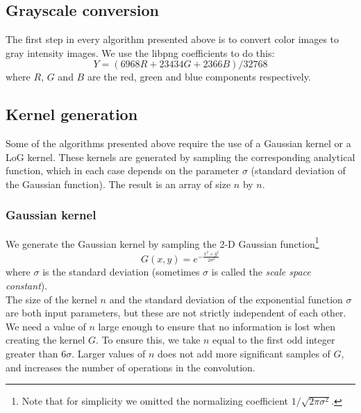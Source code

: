 \documentclass{ipol}
\numberwithin{equation}{section}
\numberwithin{table}{section}
\numberwithin{figure}{section}
\begin{document}
\subsection{Grayscale conversion}

The first step in every algorithm presented above is to convert color images to gray intensity images. 
We use the libpng coefficients to do this:
\begin{equation}
    Y = (6968 R + 23434 G + 2366 B) / 32768
\end{equation}
where $R$, $G$ and $B$ are the red, green and blue components respectively.\\

\subsection{Kernel generation}

Some of the algorithms presented above require the use of a Gaussian kernel or a LoG kernel. These 
kernels are generated by sampling the corresponding analytical function, which in each case depends 
on the parameter $\sigma$ (standard deviation of the Gaussian function). The result is an array of 
size $n$ by $n$.\\

\subsubsection{Gaussian kernel}

We generate the Gaussian kernel by sampling the 2-D Gaussian function\footnote{Note that for simplicity 
we omitted the normalizing coefficient $1/\sqrt{2\pi\sigma^2}$.}
\begin{equation}
	\label{eq:gaussian_function}
	G(x,y) = e^{-\frac{x^2+y^2}{2\sigma^2}}
\end{equation}
where $\sigma$ is the standard deviation (sometimes $\sigma$ is called the \textit{scale space constant}).\\

The size of the kernel $n$ and the standard deviation of the exponential function $\sigma$ are both 
input parameters, but these are not strictly independent of each other. We need a value 
of $n$ large enough to ensure that no information is lost when creating the kernel $G$. To ensure this, we take 
$n$ equal to the first odd integer greater than $6\sigma$. Larger values of $n$ does not add more 
significant samples ​​of $G$, and increases the number of operations in the convolution.\\
\end{document}
